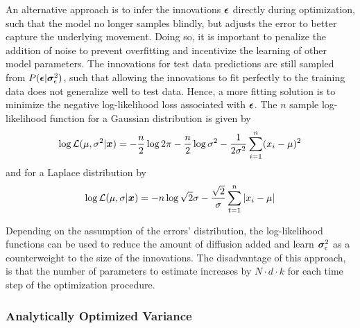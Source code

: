         An alternative approach is to infer the innovations $\bm{\epsilon}$ directly during optimization, such that the model no longer samples blindly, but adjusts the error to better capture the underlying movement. 
        Doing so, it is important to penalize the addition of noise to prevent overfitting and incentivize the learning of other model parameters. The innovations for test data predictions are still sampled from $P(\bm{\epsilon}|\bm{\sigma}_\epsilon^2)$, such that allowing the innovations to fit perfectly to the training data does not generalize well to test data. Hence, a more fitting solution is to minimize the negative log-likelihood loss associated with $\bm{\epsilon}$. The $n$ sample log-likelihood function for a Gaussian distribution is given by
        \begin{equation}\label{error-gaussian-log-loss}
            \log\mathcal{L}(\mu, \sigma^2\vert \bm{x}) = -\frac{n}{2}\log2\pi - \frac{n}{2}\log\sigma^2 - \frac{1}{2\sigma^2}\sum_{i=1}^n (x_i - \mu)^2
        \end{equation}
        and for a Laplace distribution by
        \begin{equation}\label{error-laplace-log-loss}
            \log\mathcal{L}(\mu,\sigma\vert \bm{x}) = -n\log\sqrt{2}\sigma -\frac{\sqrt{2}} {\sigma} \sum_{t=1}^n |x_i-\mu|
        \end{equation}
    
        Depending on the assumption of the errors' distribution, the log-likelihood functions can be used to reduce the amount of diffusion added and learn $\bm{\sigma}_\epsilon^2$ as a counterweight to the size of the innovations. The disadvantage of this approach, is that the number of parameters to estimate increases by $N\cdot d\cdot k$ for each time step of the optimization procedure.
        
    \subsubsection{Analytically Optimized Variance}
        
